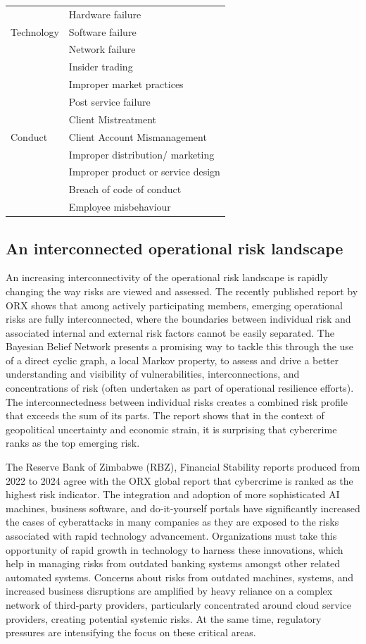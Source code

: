 \begin{table}[H]
{\begin{tabular}{|l|l|}
\hline
\multirow{3}{*}{Technology} 
 & Hardware failure \\
 & Software failure \\
 & Network failure \\
\hline
\multirow{12}{*}{Conduct} 
 & Insider trading \\
 & Improper market practices \\
 & Post service failure \\
 & Client Mistreatment \\
 & Client Account Mismanagement \\
 & Improper distribution/ marketing \\
 & Improper product or service design \\
 & Breach of code of conduct \\
 & Employee misbehaviour \\
\hline
\end{tabular}%
}
\end{table}

\subsection{An interconnected operational risk landscape }
An increasing interconnectivity of the operational risk landscape is rapidly changing the way risks are viewed and assessed. The recently published report by ORX shows that among actively participating members, emerging operational risks are fully interconnected, where the boundaries between individual risk and associated internal and external risk factors cannot be easily separated. The Bayesian Belief Network presents a promising way to tackle this through the use of a direct cyclic graph, a local Markov property, to assess and drive a better understanding and visibility of vulnerabilities, interconnections, and concentrations of risk (often undertaken as part of operational resilience efforts). The interconnectedness between individual risks creates a combined risk profile that exceeds the sum of its parts. The report shows that in the context of geopolitical uncertainty and economic strain, it is surprising that cybercrime ranks as the top emerging risk.

The Reserve Bank of Zimbabwe (RBZ), Financial Stability reports produced from 2022 to 2024 agree with the ORX global report that cybercrime is ranked as the highest risk indicator. The integration and adoption of more sophisticated AI machines, business software, and do-it-yourself portals have significantly increased the cases of cyberattacks in many companies as they are exposed to the risks associated with rapid technology advancement. Organizations must take this opportunity of rapid growth in technology to harness these innovations, which help in managing risks from outdated banking systems amongst other related automated systems. Concerns about risks from outdated machines, systems, and increased business disruptions are amplified by heavy reliance on a complex network of third-party providers, particularly concentrated around cloud service providers, creating potential systemic risks. At the same time, regulatory pressures are intensifying the focus on these critical areas.
